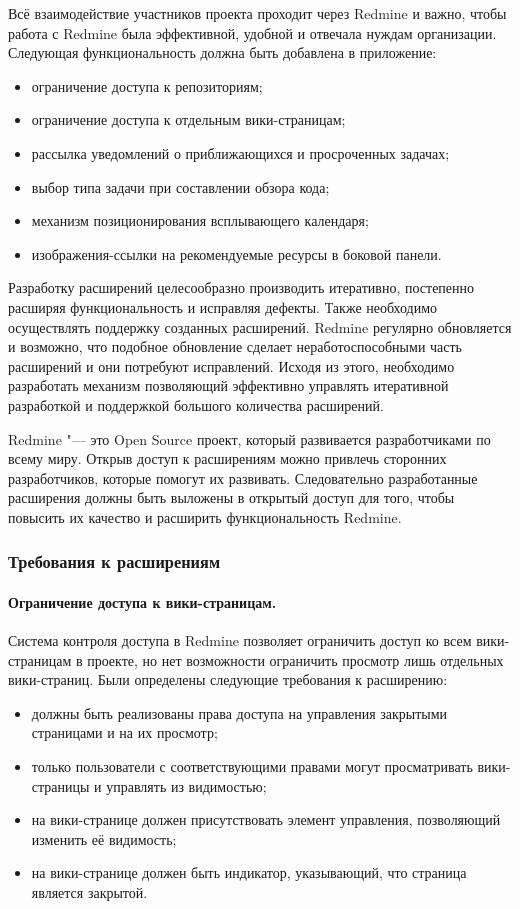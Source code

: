    
Всё взаимодействие участников проекта проходит через Redmine и важно, чтобы
работа с Redmine была эффективной, удобной и отвечала нуждам организации.
Следующая функциональность должна быть добавлена в приложение:
\begin{itemize}
  \item ограничение доступа к репозиториям;
  \item ограничение доступа к отдельным вики-страницам;
  \item рассылка уведомлений о приближающихся и просроченных задачах; 
  \item выбор типа задачи при составлении обзора кода;
  \item механизм позиционирования всплывающего календаря;
  \item изображения-ссылки на рекомендуемые ресурсы в боковой панели.
\end{itemize}

Разработку расширений целесообразно производить итеративно, постепенно расширяя
функциональность и исправляя дефекты. Также необходимо осуществлять поддержку
созданных расширений. Redmine регулярно обновляется и возможно, что подобное
обновление сделает неработоспособными часть расширений и они потребуют
исправлений. Исходя из этого, необходимо разработать механизм позволяющий
эффективно управлять итеративной разработкой и поддержкой большого количества
расширений.

Redmine "--- это Open Source проект, который развивается разработчиками по
всему миру. Открыв доступ к расширениям можно привлечь сторонних разработчиков,
которые помогут их развивать. Следовательно разработанные расширения должны
быть выложены в открытый доступ для того, чтобы повысить их качество и
расширить функциональность Redmine.

\subsubsection{Требования к расширениям}

\paragraph{Ограничение доступа к вики-страницам.}
\label{definition:private_wiki}
Система контроля доступа в Redmine позволяет ограничить доступ ко всем
вики-страницам в проекте, но нет возможности ограничить просмотр лишь
отдельных вики-страниц. Были определены следующие требования к расширению:
\begin{itemize}
  \item должны быть реализованы права доступа на управления закрытыми
  страницами и на их просмотр;
  \item только пользователи с соответствующими правами могут просматривать
  вики-страницы и управлять из видимостью;   
  \item на вики-странице должен присутствовать элемент управления, позволяющий
  изменить её видимость;
  \item на вики-странице должен быть индикатор, указывающий, что страница
  является закрытой.
\end{itemize}

